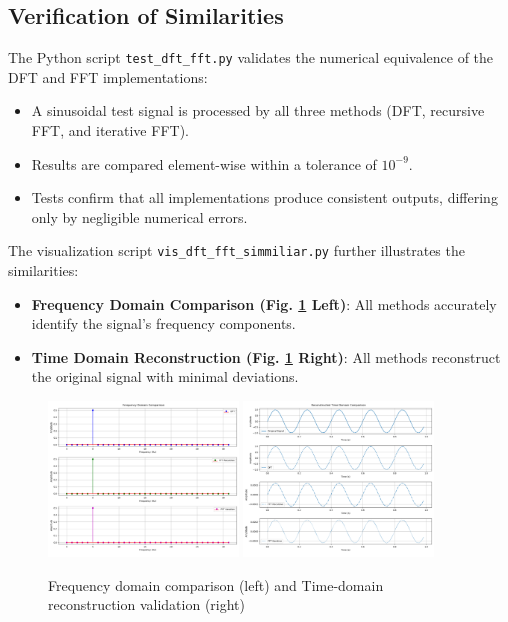 \documentclass[12pt, a4paper]{report}
\begin{document}
\subsection{Verification of Similarities}
The Python script \texttt{test\_dft\_fft.py} validates the numerical equivalence of the \ac{DFT} and \ac{FFT} implementations:
\begin{itemize}
	\item A sinusoidal test signal is processed by all three methods (\ac{DFT}, recursive \ac{FFT}, and iterative \ac{FFT}).
	\item Results are compared element-wise within a tolerance of \(10^{-9}\).
	\item Tests confirm that all implementations produce consistent outputs, differing only by negligible numerical errors.
\end{itemize}
\noindent The visualization script \texttt{vis\_dft\_fft\_simmiliar.py} further illustrates the similarities:
\begin{itemize}
	\item \textbf{Frequency Domain Comparison (Fig. \ref{fig:frequency_domain_comparison} Left)}: All methods accurately identify the signal's frequency components.
	\item \textbf{Time Domain Reconstruction (Fig. \ref{fig:frequency_domain_comparison} Right)}: All methods reconstruct the original signal with minimal deviations.
\end{itemize}

\begin{figure}[h!]
	\centering
	\includegraphics[width=0.45\textwidth]{2023_11_29_Bilder_Dokumentation/Frequency_Domain_Comparison.png}
	\includegraphics[width=0.45\textwidth]{2023_11_29_Bilder_Dokumentation/Time_Domain_Comparison.png}
	\caption{Frequency domain comparison (left) and Time-domain reconstruction validation (right)}
	\label{fig:frequency_domain_comparison}
\end{figure}
\end{document}
